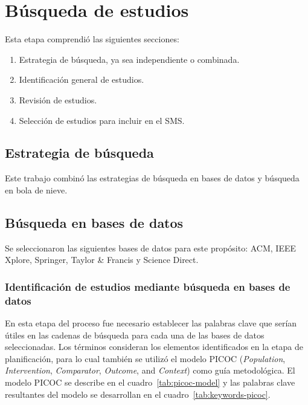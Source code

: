 \section{Búsqueda de estudios}\label{sec:estrategia-busqueda}
\noindent

Esta etapa comprendió las siguientes secciones: 
\begin{enumerate}[noitemsep, topsep=0pt, partopsep=0pt]
  \item Estrategia de búsqueda, ya sea independiente o combinada.
  \item Identificación general de estudios.
  \item Revisión de estudios.
  \item Selección de estudios para incluir en el SMS.\@
\end{enumerate}

\subsection{Estrategia de búsqueda}
\noindent
Este trabajo combinó las estrategias de búsqueda en bases de datos y búsqueda en bola de nieve. 

\subsection{Búsqueda en bases de datos}\label{subsec:busquedaBasesDatos}
\noindent
Se seleccionaron las siguientes bases de datos para este propósito: ACM, IEEE Xplore, Springer, Taylor \& Francis y Science Direct.

\subsubsection{Identificación de estudios mediante búsqueda en bases de datos}\label{subsubsec:identificacionEstudios}
\noindent
En esta etapa del proceso fue necesario establecer las palabras clave que serían útiles en las cadenas de búsqueda para cada una de las bases de datos seleccionadas. 
Los términos consideran los elementos identificados en la etapa de planificación, para lo cual también se utilizó el modelo PICOC (\textit{Population}, \textit{Intervention}, \textit{Comparator}, \textit{Outcome}, and \textit{Context}) como guía metodológica. El modelo PICOC se describe en el cuadro~\ref{tab:picoc-model} y las palabras clave resultantes del modelo se desarrollan en el cuadro~\ref{tab:keywords-picoc}.

